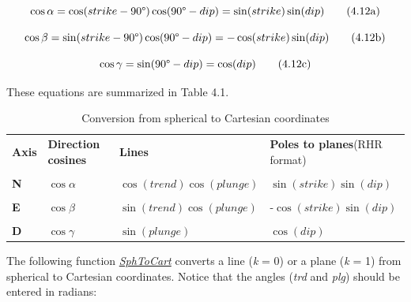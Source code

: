 \documentclass[a4paper , 12pt]{book}
\begin{document}
\begin{equation}
    \cos\alpha=\cos(strike-90\degree)\cos(90\degree-dip)=\sin(strike)\sin(dip) \tag{4.12a}
\end{equation}

\begin{equation}
     \cos\beta=\sin(strike-90\degree)\cos(90\degree-dip)=-\cos(strike)\sin(dip) \tag{4.12b}
\end{equation}

\begin{equation}
    \cos\gamma=\sin(90\degree-dip)=\cos(dip) \tag{4.12c}
\end{equation}

These equations are summarized in Table 4.1.

\begin{table}[h!]
\small
\centering
\begin{tabular}{p{1.5cm} p{2cm} p{4cm} p{3.5cm}} 
 \hline\hline
 \textbf{Axis} & \textbf{Direction cosines} & \textbf{Lines} & \textbf{Poles to planes}\newline (RHR format) \\ \\
 \hline
 \textbf{N} & $\cos\alpha$ & $\cos(trend)\cos(plunge)$ & $\sin(strike)\sin(dip)$ \\ \\
 \textbf{E} & $\cos\beta$ & $\sin(trend)\cos(plunge)$ & -$\cos(strike)\sin(dip)$ \\ \\
 \textbf{D} & $\cos\gamma$ & $\sin(plunge)$ & $\cos(dip)$ \\
 \hline\hline
\end{tabular}
\caption{Conversion from spherical to Cartesian coordinates}
\label{table4.1}
\end{table}

The following function \href{https://github.com/nfcd/compGeo/blob/master/source/functions/SphToCart.py}{\textit{SphToCart}} converts a line (\textit{k} = 0) or a plane (\textit{k} = 1) from spherical to Cartesian coordinates. Notice that the angles (\textit{trd} and \textit{plg}) should be entered in radians:
\end{document}
